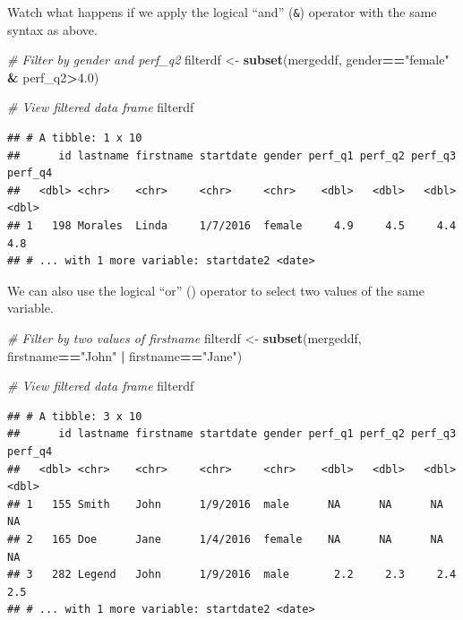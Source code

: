\documentclass[]{book}
\newenvironment{Shaded}{\begin{snugshade}}{\end{snugshade}}
\newcommand{\KeywordTok}[1]{\textcolor[rgb]{0.13,0.29,0.53}{\textbf{#1}}}
\newcommand{\FloatTok}[1]{\textcolor[rgb]{0.00,0.00,0.81}{#1}}
\newcommand{\StringTok}[1]{\textcolor[rgb]{0.31,0.60,0.02}{#1}}
\newcommand{\CommentTok}[1]{\textcolor[rgb]{0.56,0.35,0.01}{\textit{#1}}}
\newcommand{\OperatorTok}[1]{\textcolor[rgb]{0.81,0.36,0.00}{\textbf{#1}}}
\newcommand{\NormalTok}[1]{#1}
\begin{document}
Watch what happens if we apply the logical ``and'' (\texttt{\&})
operator with the same syntax as above.

\begin{Shaded}
\begin{Highlighting}[]
\CommentTok{# Filter by gender and perf_q2}
\NormalTok{filterdf <-}\StringTok{ }\KeywordTok{subset}\NormalTok{(mergeddf, gender}\OperatorTok{==}\StringTok{"female"} \OperatorTok{&}\StringTok{ }\NormalTok{perf_q2}\OperatorTok{>}\FloatTok{4.0}\NormalTok{)}

\CommentTok{# View filtered data frame}
\NormalTok{filterdf}
\end{Highlighting}
\end{Shaded}

\begin{verbatim}
## # A tibble: 1 x 10
##      id lastname firstname startdate gender perf_q1 perf_q2 perf_q3 perf_q4
##   <dbl> <chr>    <chr>     <chr>     <chr>    <dbl>   <dbl>   <dbl>   <dbl>
## 1   198 Morales  Linda     1/7/2016  female     4.9     4.5     4.4     4.8
## # ... with 1 more variable: startdate2 <date>
\end{verbatim}

We can also use the logical ``or'' (\texttt{\textbar{}}) operator to
select two values of the same variable.

\begin{Shaded}
\begin{Highlighting}[]
\CommentTok{# Filter by two values of firstname}
\NormalTok{filterdf <-}\StringTok{ }\KeywordTok{subset}\NormalTok{(mergeddf, firstname}\OperatorTok{==}\StringTok{"John"} \OperatorTok{|}\StringTok{ }\NormalTok{firstname}\OperatorTok{==}\StringTok{"Jane"}\NormalTok{)}

\CommentTok{# View filtered data frame}
\NormalTok{filterdf}
\end{Highlighting}
\end{Shaded}

\begin{verbatim}
## # A tibble: 3 x 10
##      id lastname firstname startdate gender perf_q1 perf_q2 perf_q3 perf_q4
##   <dbl> <chr>    <chr>     <chr>     <chr>    <dbl>   <dbl>   <dbl>   <dbl>
## 1   155 Smith    John      1/9/2016  male      NA      NA      NA      NA  
## 2   165 Doe      Jane      1/4/2016  female    NA      NA      NA      NA  
## 3   282 Legend   John      1/9/2016  male       2.2     2.3     2.4     2.5
## # ... with 1 more variable: startdate2 <date>
\end{verbatim}
\end{document}
